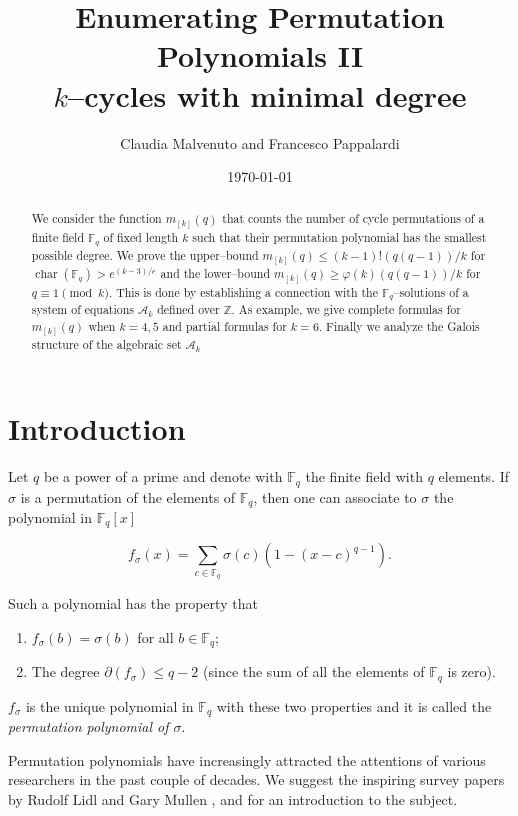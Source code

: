 \documentclass[a4paper,twoside]{article}
\title{Enumerating Permutation Polynomials II\\
$k$--cycles with minimal degree}
\author{Claudia Malvenuto and Francesco Pappalardi}
\date{\today}
\begin{document}
\maketitle

\begin{abstract}
We consider the function $m_{[k]}(q)$ that counts the number of
cycle permutations of a finite field $\mathbb F_q$ of fixed length
$k$ such that their permutation polynomial has the smallest
possible degree. We prove the upper--bound $m_{[k]}(q)\leq
(k-1)!(q(q-1))/k$  for $\operatorname{char}(\mathbb F_q)>
e^{(k-3)/e}$ and the lower--bound $m_{[k]}(q)\geq
\varphi(k)(q(q-1))/k$ for $q\equiv1\pmod k$. This is done by
establishing a connection with the $\mathbb F_q$--solutions of a
system of equations $\mathcal A_k$ defined over $\mathbb Z$. As
example, we give complete formulas for $m_{[k]}(q)$ when $k=4,5$
and partial formulas for $k=6$. Finally we analyze the Galois
structure of the algebraic set $\mathcal A_k$
\end{abstract}

\tableofcontents\vfill\pagebreak

\section{Introduction}

Let $q$ be a power of a prime and denote with $\mathbb F_q$ the finite
field with $q$ elements. If $\sigma$ is a permutation of the elements of $\mathbb F_q$,
then one can associate to $\sigma$ the polynomial in $\mathbb F_q[x]$

\begin{equation}\label{primadef}
f_\sigma(x)=\sum_{c\in\mathbb F_q}\sigma(c)\left(1-\left(x-c\right)^{q-1}\right).
\end{equation}

Such a polynomial has the property that

\begin{enumerate}
\item $f_\sigma(b)=\sigma(b)$ for all $b\in\mathbb F_q$;
\item The degree $\partial(f_\sigma)\leq q-2$ (since the sum of all the elements of $\mathbb F_q$ is zero).
\end{enumerate}

$f_\sigma$ is the unique polynomial in $\mathbb F_q$ with these
two properties and it is called the \emph{permutation polynomial of $\sigma$}.

Permutation polynomials have increasingly attracted the attentions of various researchers
in the past couple of decades. We suggest the inspiring survey papers by Rudolf Lidl and
Gary Mullen \cite{M}, \cite{LM1} and \cite{LM2}
for an introduction to the subject.
\end{document}
